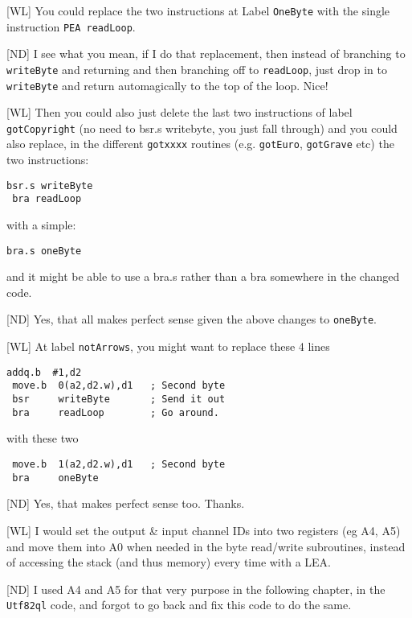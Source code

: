 [WL] You could replace the two instructions at Label \texttt{OneByte} with the single instruction \texttt{PEA readLoop}.

[ND] I see what you mean, if I do that replacement, then instead of branching to \texttt{writeByte} and returning and then branching off to \texttt{readLoop}, just drop in to \texttt{writeByte} and return automagically to the top of the loop. Nice!


[WL] Then you could also just delete the last two instructions of label \texttt{gotCopyright} (no need to bsr.s writebyte, you just fall through) and you could also replace, in the different \texttt{gotxxxx} routines (e.g. \texttt{gotEuro}, \texttt{gotGrave} etc) the two instructions:

\begin{lstlisting}[numbers=none]
 bsr.s writeByte
 bra readLoop
\end{lstlisting}
 
with a simple:

\begin{lstlisting}[numbers=none]
 bra.s oneByte
\end{lstlisting}
 
and it might be able to use a bra.s rather than a bra somewhere in the changed code.

[ND] Yes, that all makes perfect sense given the above changes to \texttt{oneByte}.

[WL] At label \texttt{notArrows}, you might want to replace these 4 lines

\begin{lstlisting}[numbers=none]
 addq.b  #1,d2
 move.b  0(a2,d2.w),d1   ; Second byte
 bsr     writeByte       ; Send it out
 bra     readLoop        ; Go around.
\end{lstlisting}

with these two

\begin{lstlisting}
 move.b  1(a2,d2.w),d1   ; Second byte
 bra     oneByte
\end{lstlisting}
 
[ND] Yes, that makes perfect sense too. Thanks.


[WL] I would set the output \& input channel IDs into two registers (eg A4, A5) and move them into A0 when needed in the byte read/write subroutines, instead of accessing the stack (and thus memory) every time with a LEA.

[ND] I used A4 and A5 for that very purpose in the following chapter, in the \texttt{Utf82ql} code, and forgot to go back and fix this code to do the same.

